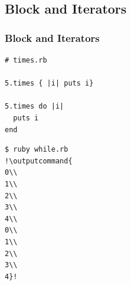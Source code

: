 \documentclass{beamer}
\newcommand{\outputcommand}[1]{\color{darkgreen}{#1}}
\begin{document}
\subsection{Block and Iterators}
\begin{frame}[fragile]
\frametitle{Block and Iterators}
\lstset{language=Ruby, style=eclipse}
\begin{lstlisting}[escapechar=&]
# times.rb

5.times { |i| puts i}

5.times do |i|
  puts i
end
\end{lstlisting}

\lstset{language=shell}
\begin{lstlisting}[numbers=none, escapechar=!]
$ ruby while.rb
!\outputcommand{
0\\
1\\
2\\
3\\
4\\
0\\
1\\
2\\
3\\
4}!
\end{lstlisting}
\end{frame}
\end{document}
